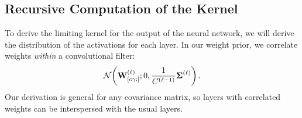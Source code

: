 \documentclass{article}
\theoremstyle{definition}
\begin{document}
\subsection{Recursive Computation of the Kernel}
To derive the limiting kernel for the output of the neural network, we will derive the distribution of the activations for each layer. In our weight prior, we correlate weights \emph{within} a convolutional filter:
\begin{align}
    \NormDist{\layerW{\ell}_{[c\gamma :]}; 0, \frac{1}{\layerC{\ell-1}} \priorWcov{\ell}} \,.
\end{align}
Our derivation is general for any covariance matrix, so layers with correlated weights can be interspersed with the usual layers.
\end{document}
